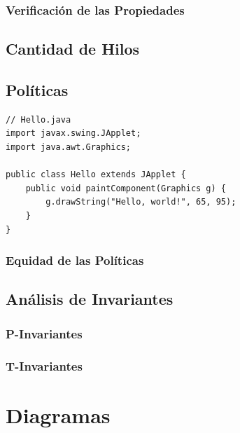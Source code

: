 \documentclass[12pt]{article}
\begin{document}
\subsubsection{Verificación de las Propiedades}
\subsection{Cantidad de Hilos}
\subsection{Políticas}
\begin{lstlisting}
// Hello.java
import javax.swing.JApplet;
import java.awt.Graphics;

public class Hello extends JApplet {
    public void paintComponent(Graphics g) {
        g.drawString("Hello, world!", 65, 95);
    }    
}
\end{lstlisting}
\subsubsection{Equidad de las Políticas}
\subsection{Análisis de Invariantes}
\subsubsection{P-Invariantes}
\subsubsection{T-Invariantes}


\pagebreak
\section{Diagramas}
\end{document}
